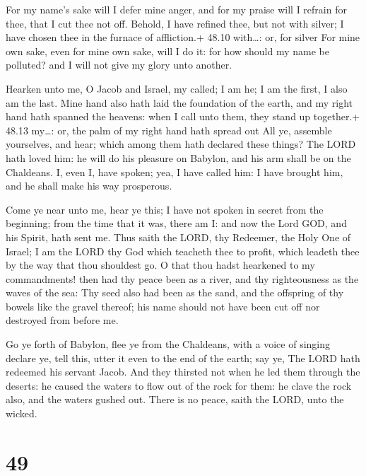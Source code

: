  For my name's sake will I defer mine anger, and for my
praise will I refrain for thee, that I cut thee not off. 
Behold, I have refined thee, but not with silver; I have chosen thee in
the furnace of affliction.+ 48.10 with\ldots: or, for silver
 For mine own sake, even for mine own sake, will I do it:
for how should my name be polluted? and I will not give my glory unto
another.

 Hearken unto me, O Jacob and Israel, my called; I am he;
I am the first, I also am the last.  Mine hand also hath
laid the foundation of the earth, and my right hand hath spanned the
heavens: when I call unto them, they stand up together.+ 48.13 my\ldots:
or, the palm of my right hand hath spread out  All ye,
assemble yourselves, and hear; which among them hath declared these
things? The LORD hath loved him: he will do his pleasure on Babylon, and
his arm shall be on the Chaldeans.  I, even I, have spoken;
yea, I have called him: I have brought him, and he shall make his way
prosperous.

 Come ye near unto me, hear ye this; I have not spoken in
secret from the beginning; from the time that it was, there am I: and
now the Lord GOD, and his Spirit, hath sent me.  Thus saith
the LORD, thy Redeemer, the Holy One of Israel; I am the LORD thy God
which teacheth thee to profit, which leadeth thee by the way that thou
shouldest go.  O that thou hadst hearkened to my
commandments! then had thy peace been as a river, and thy righteousness
as the waves of the sea:  Thy seed also had been as the
sand, and the offspring of thy bowels like the gravel thereof; his name
should not have been cut off nor destroyed from before me.

 Go ye forth of Babylon, flee ye from the Chaldeans, with
a voice of singing declare ye, tell this, utter it even to the end of
the earth; say ye, The LORD hath redeemed his servant Jacob.
 And they thirsted not when he led them through the
deserts: he caused the waters to flow out of the rock for them: he clave
the rock also, and the waters gushed out.  There is no
peace, saith the LORD, unto the wicked.

\hypertarget{section-48}{%
\section{49}\label{section-48}}

